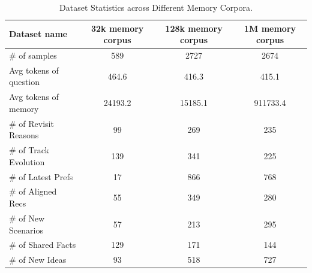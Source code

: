 \begin{table}[htbp]
\centering
\caption{Dataset Statistics across Different Memory Corpora.}
\label{tab:personamem_desc_overall}
    \begin{tabular}{lccc}
    \toprule
    \textbf{Dataset name} & \textbf{32k memory corpus} & \textbf{128k memory corpus} & \textbf{1M memory corpus} \\
    \midrule
    \# of samples            & 589   & 2727   & 2674 \\
    Avg tokens of question   & 464.6 & 416.3  & 415.1 \\
    Avg tokens of memory     & 24193.2 & 15185.1 & 911733.4 \\
    \midrule
    \# of Revisit Reasons    & 99    & 269    & 235 \\
    \# of Track Evolution    & 139   & 341    & 225 \\
    \# of Latest Prefs       & 17    & 866    & 768 \\
    \# of Aligned Recs       & 55    & 349    & 280 \\
    \# of New Scenarios      & 57    & 213    & 295 \\
    \# of Shared Facts       & 129   & 171    & 144 \\
    \# of New Ideas          & 93    & 518    & 727 \\
    \bottomrule
    \end{tabular}
\vspace{-10pt}
\end{table}

